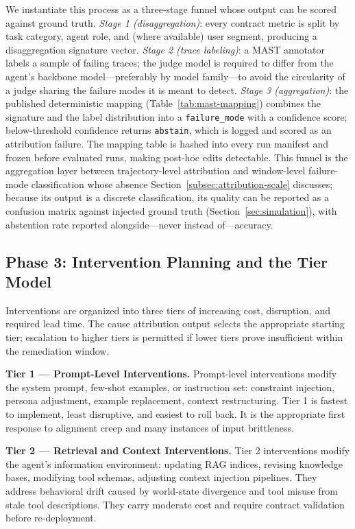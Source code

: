 \documentclass[conference]{IEEEtran}
\begin{document}
We instantiate this process as a three-stage funnel whose output can be scored
against ground truth. \emph{Stage 1 (disaggregation)}: every contract metric is
split by task category, agent role, and (where available) user segment,
producing a disaggregation signature vector. \emph{Stage 2 (trace labeling)}: a
MAST annotator~\cite{cemri2025mast} labels a sample of failing traces; the
judge model is required to differ from the agent's backbone model---preferably
by model family---to avoid the circularity of a judge sharing the failure modes
it is meant to detect. \emph{Stage 3 (aggregation)}: the published
deterministic mapping (Table~\ref{tab:mast-mapping}) combines the signature
and the label distribution into a \texttt{failure\_mode} with a confidence
score; below-threshold confidence returns \texttt{abstain}, which is logged
and scored as an attribution failure. The mapping table is hashed into every
run manifest and frozen before evaluated runs, making post-hoc edits
detectable. This funnel is the aggregation layer between trajectory-level
attribution and window-level failure-mode classification whose absence
Section~\ref{subsec:attribution-scale} discusses; because its output is a
discrete classification, its quality can be reported as a confusion matrix
against injected ground truth (Section~\ref{sec:simulation}), with abstention
rate reported alongside---never instead of---accuracy.

\subsection{Phase 3: Intervention Planning and the Tier Model}
\label{subsec:tiers}

Interventions are organized into three tiers of increasing cost, disruption,
and required lead time. The cause attribution output selects the appropriate
starting tier; escalation to higher tiers is permitted if lower tiers prove
insufficient within the remediation window.

\textbf{Tier 1 --- Prompt-Level Interventions.} Prompt-level interventions
modify the system prompt, few-shot examples, or instruction set: constraint
injection, persona adjustment, example replacement, context restructuring.
Tier 1 is fastest to implement, least disruptive, and easiest to roll back. It
is the appropriate first response to alignment creep and many instances of
input brittleness.

\textbf{Tier 2 --- Retrieval and Context Interventions.} Tier 2 interventions
modify the agent's information environment: updating RAG indices, revising
knowledge bases, modifying tool schemas, adjusting context injection pipelines.
They address behavioral drift caused by world-state divergence and tool misuse
from stale tool descriptions. They carry moderate cost and require contract
validation before re-deployment.
\end{document}
